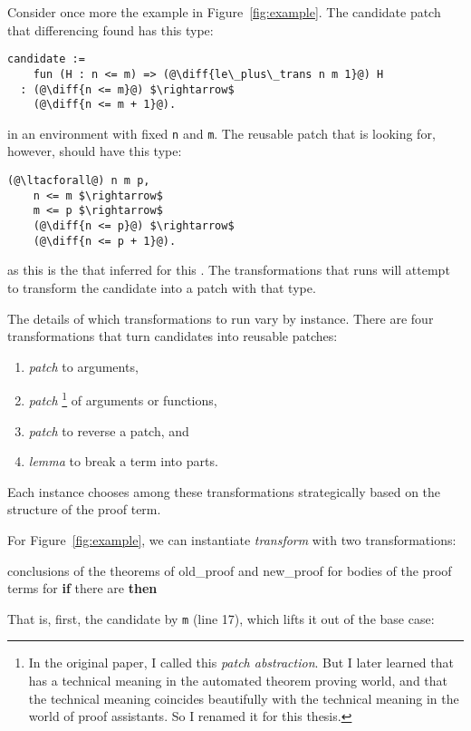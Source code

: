 Consider once more the example in Figure~\ref{fig:example}.
The candidate patch that differencing found has this type:

\begin{lstlisting}[language=coq]
  candidate :=
    fun (H : n <= m) => (@\diff{le\_plus\_trans n m 1}@) H
  : (@\diff{n <= m}@) $\rightarrow$
    (@\diff{n <= m + 1}@).
\end{lstlisting}
in an environment with fixed \lstinline{n} and \lstinline{m}.
The reusable patch that \sysname is looking for, however, should have this type:

\begin{lstlisting}[language=coq]
  (@\ltacforall@) n m p,
    n <= m $\rightarrow$
    m <= p $\rightarrow$
    (@\diff{n <= p}@) $\rightarrow$
    (@\diff{n <= p + 1}@).
\end{lstlisting}
as this is the  that \sysname inferred for this .
The transformations that \sysname runs will attempt to transform the candidate
into a patch with that type.

The details of which transformations to run vary by instance.
There are four transformations that turn candidates into reusable patches:

\begin{enumerate}
\item \textit{patch}  to arguments,
\item \textit{patch} \footnote{In the original paper, I called this \textit{patch abstraction}. But I later learned that  has a technical meaning in the automated theorem proving world, and that the technical meaning coincides beautifully with the technical meaning in the world of proof assistants. So I renamed it for this thesis.} of arguments or functions,
\item \textit{patch}  to reverse a patch, and
\item \textit{lemma}  to break a term into parts.
\end{enumerate}
Each instance chooses among these transformations strategically based on the structure of the proof term.

For Figure~\ref{fig:example}, we can instantiate \textit{transform} with two transformations:

\begin{algorithm}
\footnotesize
\begin{algorithmic}[1]
    \STATE {} conclusions of the theorems of old\_proof and new\_proof for 
    \STATE {} bodies of the proof terms for 
    \STATE \textbf{if} there are  \textbf{then}
    \STATE \hspace*{1em}  
\end{algorithmic}
\end{algorithm}
That is, first, \sysname {} the candidate by \lstinline{m} (line 17), which lifts it out of the base case:

